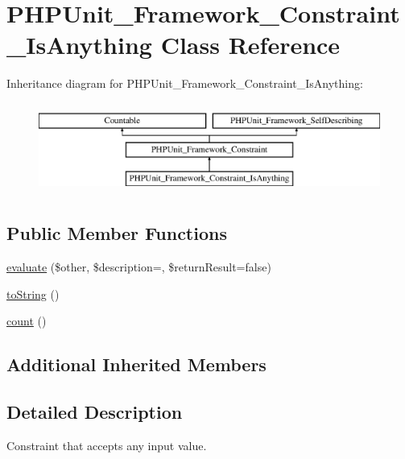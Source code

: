 \hypertarget{class_p_h_p_unit___framework___constraint___is_anything}{}\section{P\+H\+P\+Unit\+\_\+\+Framework\+\_\+\+Constraint\+\_\+\+Is\+Anything Class Reference}
\label{class_p_h_p_unit___framework___constraint___is_anything}
Inheritance diagram for P\+H\+P\+Unit\+\_\+\+Framework\+\_\+\+Constraint\+\_\+\+Is\+Anything\+:\begin{figure}[H]
\begin{center}
\leavevmode
\includegraphics[height=3.000000cm]{class_p_h_p_unit___framework___constraint___is_anything}
\end{center}
\end{figure}
\subsection*{Public Member Functions}
\begin{DoxyCompactItemize}
\item 
\mbox{\hyperlink{class_p_h_p_unit___framework___constraint___is_anything_a4c184790087f7d42c3daf0d0180fe5fb}{evaluate}} (\$other, \$description=\textquotesingle{}\textquotesingle{}, \$return\+Result=false)
\item 
\mbox{\hyperlink{class_p_h_p_unit___framework___constraint___is_anything_a5558c5d549f41597377fa1ea8a1cefa3}{to\+String}} ()
\item 
\mbox{\hyperlink{class_p_h_p_unit___framework___constraint___is_anything_ac751e87b3d4c4bf2feb03bee8b092755}{count}} ()
\end{DoxyCompactItemize}
\subsection*{Additional Inherited Members}


\subsection{Detailed Description}
Constraint that accepts any input value. 

